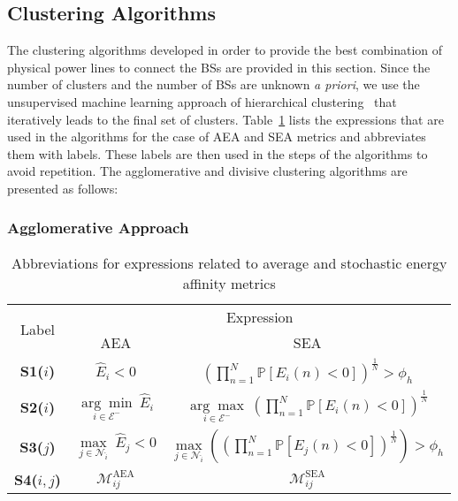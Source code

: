 \documentclass[10pt, letter,twocolumn]{IEEEtran}
\begin{document}
\vspace{-0.0cm}
\subsection{Clustering Algorithms}
The clustering algorithms developed in order to provide the best combination of physical power lines to connect the BSs are provided in this section. Since the number of clusters and the number of BSs are unknown \emph{a priori}, we use the unsupervised machine learning approach of hierarchical clustering~\cite{algorithms} that iteratively leads to the final set of clusters. Table~\ref{table_expressions} lists the expressions that are used in the algorithms for the case of AEA and SEA metrics and abbreviates them with labels. These labels are then used in the steps of the algorithms to avoid repetition. The agglomerative and divisive clustering algorithms are presented as follows:
\subsubsection{Agglomerative Approach}

\begin{table}[]
\centering

\caption{Abbreviations for expressions related to average and stochastic energy affinity metrics}\vspace{-0.1in}
\label{table_expressions}
\begin{tabular}{|c|c|c|}
\hline
\multirow{2}{*}{Label} & \multicolumn{2}{c|}{Expression} \\ \cline{2-3}
                       & AEA       & SEA      \\ \hline
\textbf{S1($i$)}     &       $\hat{E}_{i} < 0$        &      $\left(\prod_{n=1}^{N} \mathbb{P}[E_{i}(n) < 0]\right)^{\frac{1}{N}} > \phi_{h}$        \\ \hline
\textbf{S2($i$)}     &   $\underset{i \in \mathcal{E}^{-}}{\arg \min} \ \hat{E}_{i}$   &   $\underset{i \in \mathcal{E}^{-}}{\arg \max} \  \left(\prod_{n=1}^{N} \mathbb{P}[E_{i}(n) < 0]\right)^{\frac{1}{N}}$              \\ \hline
\textbf{S3($j$)}   &         $\underset{j \in \mathcal{N}_{\hat{i}}}{\max} \ \hat{E}_{j} < 0$      &       $\underset{j \in \mathcal{N}_{\hat{i}}}{\max} \left(  \left(\prod_{n=1}^{N} \mathbb{P}[E_{j}(n) < 0] \right)^{\frac{1}{N}} \right) > \phi_{h}$          \\ \hline
\textbf{S4($i,j$)}     &         $\mathcal{M}_{ij}^{\text{AEA}}$      &       $\mathcal{M}_{ij}^{\text{SEA}}$          \\ \hline
\end{tabular}\vspace{-0.0cm}
\end{table}
\end{document}
